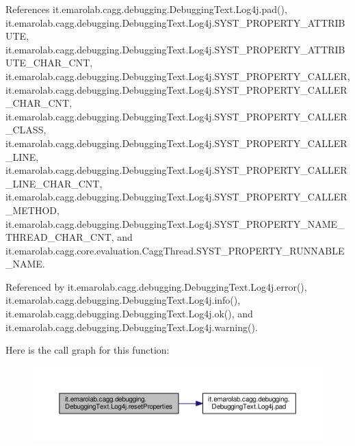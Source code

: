 References it.\-emarolab.\-cagg.\-debugging.\-Debugging\-Text.\-Log4j.\-pad(), it.\-emarolab.\-cagg.\-debugging.\-Debugging\-Text.\-Log4j.\-S\-Y\-S\-T\-\_\-\-P\-R\-O\-P\-E\-R\-T\-Y\-\_\-\-A\-T\-T\-R\-I\-B\-U\-T\-E, it.\-emarolab.\-cagg.\-debugging.\-Debugging\-Text.\-Log4j.\-S\-Y\-S\-T\-\_\-\-P\-R\-O\-P\-E\-R\-T\-Y\-\_\-\-A\-T\-T\-R\-I\-B\-U\-T\-E\-\_\-\-C\-H\-A\-R\-\_\-\-C\-N\-T, it.\-emarolab.\-cagg.\-debugging.\-Debugging\-Text.\-Log4j.\-S\-Y\-S\-T\-\_\-\-P\-R\-O\-P\-E\-R\-T\-Y\-\_\-\-C\-A\-L\-L\-E\-R, it.\-emarolab.\-cagg.\-debugging.\-Debugging\-Text.\-Log4j.\-S\-Y\-S\-T\-\_\-\-P\-R\-O\-P\-E\-R\-T\-Y\-\_\-\-C\-A\-L\-L\-E\-R\-\_\-\-C\-H\-A\-R\-\_\-\-C\-N\-T, it.\-emarolab.\-cagg.\-debugging.\-Debugging\-Text.\-Log4j.\-S\-Y\-S\-T\-\_\-\-P\-R\-O\-P\-E\-R\-T\-Y\-\_\-\-C\-A\-L\-L\-E\-R\-\_\-\-C\-L\-A\-S\-S, it.\-emarolab.\-cagg.\-debugging.\-Debugging\-Text.\-Log4j.\-S\-Y\-S\-T\-\_\-\-P\-R\-O\-P\-E\-R\-T\-Y\-\_\-\-C\-A\-L\-L\-E\-R\-\_\-\-L\-I\-N\-E, it.\-emarolab.\-cagg.\-debugging.\-Debugging\-Text.\-Log4j.\-S\-Y\-S\-T\-\_\-\-P\-R\-O\-P\-E\-R\-T\-Y\-\_\-\-C\-A\-L\-L\-E\-R\-\_\-\-L\-I\-N\-E\-\_\-\-C\-H\-A\-R\-\_\-\-C\-N\-T, it.\-emarolab.\-cagg.\-debugging.\-Debugging\-Text.\-Log4j.\-S\-Y\-S\-T\-\_\-\-P\-R\-O\-P\-E\-R\-T\-Y\-\_\-\-C\-A\-L\-L\-E\-R\-\_\-\-M\-E\-T\-H\-O\-D, it.\-emarolab.\-cagg.\-debugging.\-Debugging\-Text.\-Log4j.\-S\-Y\-S\-T\-\_\-\-P\-R\-O\-P\-E\-R\-T\-Y\-\_\-\-N\-A\-M\-E\-\_\-\-T\-H\-R\-E\-A\-D\-\_\-\-C\-H\-A\-R\-\_\-\-C\-N\-T, and it.\-emarolab.\-cagg.\-core.\-evaluation.\-Cagg\-Thread.\-S\-Y\-S\-T\-\_\-\-P\-R\-O\-P\-E\-R\-T\-Y\-\_\-\-R\-U\-N\-N\-A\-B\-L\-E\-\_\-\-N\-A\-M\-E.



Referenced by it.\-emarolab.\-cagg.\-debugging.\-Debugging\-Text.\-Log4j.\-error(), it.\-emarolab.\-cagg.\-debugging.\-Debugging\-Text.\-Log4j.\-info(), it.\-emarolab.\-cagg.\-debugging.\-Debugging\-Text.\-Log4j.\-ok(), and it.\-emarolab.\-cagg.\-debugging.\-Debugging\-Text.\-Log4j.\-warning().



Here is the call graph for this function\-:\nopagebreak
\begin{figure}[H]
\begin{center}
\leavevmode
\includegraphics[width=350pt]{classit_1_1emarolab_1_1cagg_1_1debugging_1_1DebuggingText_1_1Log4j_abcc007e4a0e7242d76ecea6a42e6ae6f_cgraph}
\end{center}
\end{figure}


